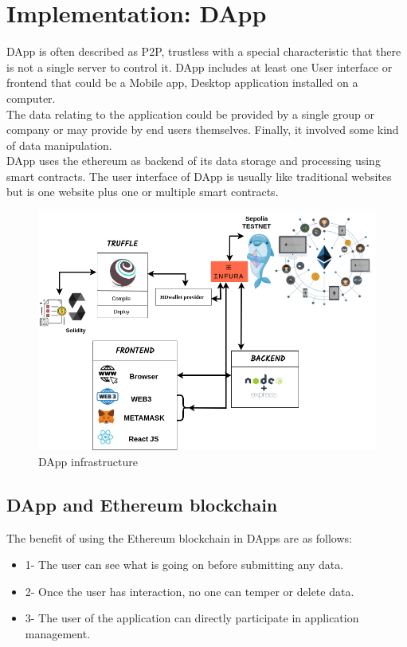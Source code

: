 \chapter{Implementation: DApp}
DApp is often described as P2P, trustless with a special characteristic that there is not a single server to control it. DApp includes at least one User interface or frontend that could be a Mobile app, Desktop application installed on a computer.\\
The data relating to the application could be provided by a single group or company or may provide by end users themselves. Finally, it involved some kind of data manipulation. \\
DApp uses the ethereum as backend of its data storage and processing using smart contracts. The user interface of DApp is usually like traditional websites but is one website plus one or multiple smart contracts.

\begin{center}
	
	\begin{figure}[htb!]
		
		\begin{minipage}{0.5\linewidth}
			
			\includegraphics[width=1.45\textwidth]{images/chap03_dapp.png}
		\end{minipage}
		\caption{DApp infrastructure}
		
	\end{figure}
	
\end{center}

\section{DApp and Ethereum blockchain}
The benefit of using the Ethereum blockchain in DApps are as follows:
 \begin{itemize}
     \item 1- The user can see what is going on before submitting any data.
     \item 2- Once the user has interaction, no one can temper or delete data.
     \item 3- The user of the application can directly participate in application management.
 \end{itemize}

